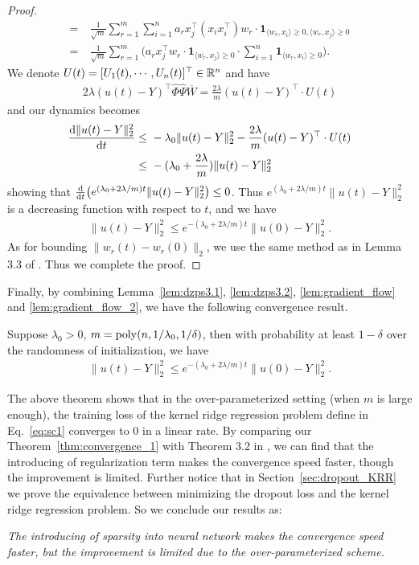 \begin{proof}
\begin{align*}
    = & ~ \frac{1}{\sqrt{m}}\sum_{r=1}^m \sum_{i=1}^n a_r x_j^\top (x_i x_i^\top) w_r \cdot \mathbf{1}_{\langle w_r, x_i \rangle \geq 0, \langle w_r, x_j \rangle \geq 0} \\
    = & ~ \frac{1}{\sqrt{m}}\sum_{r=1}^m \Big(a_r x_j^\top w_r \cdot \mathbf{1}_{\langle w_r, x_j \rangle \geq 0}\cdot \sum_{i=1}^n \mathbf{1}_{\langle w_r, x_i \rangle \geq 0}\Big). %
\end{align*}
We denote $U(t) = [U_1(t),\cdots, U_n(t)]^\top\in\mathbb{R}^n$ and have
\begin{align}
    \label{eq:U}
    2\lambda (u(t) - Y)^\top\hat{\Phi} \hat{\Psi} \overline{W} = \frac{2\lambda}{m} (u(t) - Y)^\top \cdot U(t)
\end{align}
and our dynamics becomes
\begin{align}
    \label{eq:new_ode}
    \frac{\mathrm{d} \|u(t) - Y \|_2^2}{\mathrm{d} t} \leq & ~ -\lambda_0 \|u(t) - Y\|_2^2 - \frac{2\lambda}{m} (u(t) - Y)^\top \cdot U(t) \notag \\
    \leq & ~ -(\lambda_0 + \frac{2\lambda}{m}) \|u(t) - Y\|_2^2
\end{align}
showing that $\frac{\mathrm{d}}{\mathrm{d} t}\big(e^{(\lambda_0+2\lambda/m) t}\|u(t) - Y\|_2^2 \big) \leq 0$. Thus $e^{(\lambda_0+2\lambda/m) t}\|u(t) - Y\|_2^2$ is a decreasing function with respect to $t$, and we have
\begin{align*}
    \|u(t) - Y\|_2^2 \leq e^{-(\lambda_0+2\lambda/m) t} \|u(0) - Y\|_2^2.
\end{align*}
As for bounding $\|w_r(t) - w_r(0)\|_2$, we use the same method as in Lemma 3.3 of \cite{dzps19}. Thus we complete the proof.
\end{proof}

Finally, by combining Lemma~\ref{lem:dzps3.1}, \ref{lem:dzps3.2}, \ref{lem:gradient_flow} and \ref{lem:gradient_flow_2}, we have the following convergence result.
\begin{theorem}\label{thm:convergence_1}
Suppose $\lambda_0>0$, $m = \mathrm{poly}(n, 1/ \lambda_0, 1/ \delta)$, then with probability at least $1-\delta$ over the randomness of initialization, we have
\begin{align*}
    \|u(t) - Y\|_2^2 \leq e^{-(\lambda_0 + 2\lambda/m)t} \|u(0) - Y\|_2^2.
\end{align*}
\end{theorem}
The above theorem shows that in the over-parameterized setting (when $m$ is large enough), the training loss of the kernel ridge regression problem define in Eq.~\eqref{eq:sc1} converges to $0$ in a linear rate. By comparing our Theorem~\ref{thm:convergence_1} with Theorem 3.2 in \cite{dzps19}, we can find that the introducing of regularization term makes the convergence speed faster, though the improvement is limited. Further notice that in Section~\ref{sec:dropout_KRR} we prove the equivalence between minimizing the dropout loss and the kernel ridge regression problem. So we conclude our results as:
\begin{center}
    \emph{The introducing of sparsity into neural network makes the convergence speed faster, but the improvement is limited due to the over-parameterized scheme.}
\end{center}

